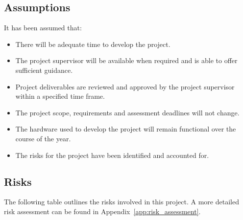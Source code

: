 \documentclass[a4paper]{article}
\begin{document}
{{		}
		
		\subsection{Assumptions} {
		\label{sec:assumptions}
		
			It has been assumed that:
			
			\begin{itemize}
				\item There will be adequate time to develop the project.
				\item The project supervisor will be available when required and is able to offer sufficient guidance.
				\item Project deliverables are reviewed and approved by the project supervisor within a specified time frame.
				\item The project scope, requirements and assessment deadlines will not change.
				\item The hardware used to develop the project will remain functional over the course of the year.
				\item The risks for the project have been identified and accounted for.
			\end{itemize}
		
		}
		
		\subsection{Risks} {
		\label{sec:risks}

			The following table outlines the risks involved in this project. A more detailed risk assessment can be found in Appendix~\ref{app:risk_assessment}.
			
}}
\end{document}

